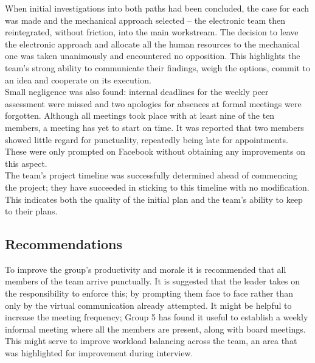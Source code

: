 When initial investigations into both paths had been concluded, the case for each was made and the mechanical approach selected -- the electronic team then reintegrated, without friction, into the main workstream. The decision to leave the electronic approach and allocate all the human resources to the mechanical one was taken unanimously and encountered no opposition. This highlights the team's strong ability to communicate their findings, weigh the options, commit to an idea and cooperate on its execution.\\
Small negligence was also found: internal deadlines for the weekly peer assessment were missed and two apologies for absences at formal meetings were forgotten. Although all meetings took place with at least nine of the ten members, a meeting has yet to start on time. It was reported that two members showed little regard for punctuality, repeatedly being late for appointments. These were only prompted on Facebook without obtaining any improvements on this aspect.\\
The team's project timeline was successfully determined ahead of commencing the project; they have succeeded in sticking to this timeline with no modification. This indicates both the quality of the initial plan and the team's ability to keep to their plans.
\subsection*{Recommendations}
To improve the group's productivity and morale it is recommended that all members of the team arrive punctually. It is suggested that the leader takes on the responsibility to enforce this; by prompting them face to face rather than only by the virtual communication already attempted. It might be helpful to increase the meeting frequency; Group 5 has found it useful to establish a weekly informal meeting where all the members are present, along with board meetings. This might serve to improve workload balancing across the team, an area that was highlighted for improvement during interview.

